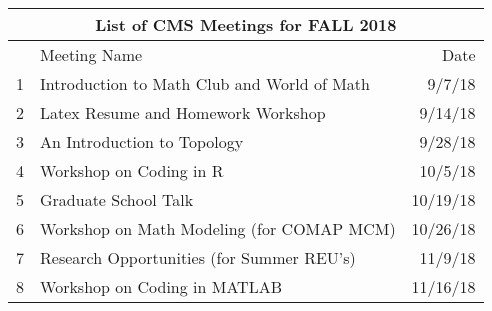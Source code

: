 \documentclass{invoice} %
\begin{document}

\begin{table}[ht!]
\centering
 \begin{tabular}{||l |l r ||} 
 \hline
 \multicolumn{3}{|c|}{List of CMS Meetings for FALL 2018} \\
 \hline
  & Meeting Name & Date \\  
 \hline\hline
 1& Introduction to Math Club and World of Math & 9/7/18 \\ \hline
 2& Latex Resume and Homework Workshop &  9/14/18 \\ \hline
 3& An Introduction to Topology  & 9/28/18\\ \hline
 4& Workshop on Coding in R & 10/5/18  \\\hline
 5& Graduate School Talk & 10/19/18\\ \hline
 6& Workshop on Math Modeling (for COMAP MCM) & 10/26/18\\ \hline
 7& Research Opportunities (for Summer REU's) & 11/9/18\\ \hline
 8& Workshop on Coding in MATLAB & 11/16/18 \\
 \hline
 \end{tabular}
\end{table}
\vfill
\null
\end{document}
